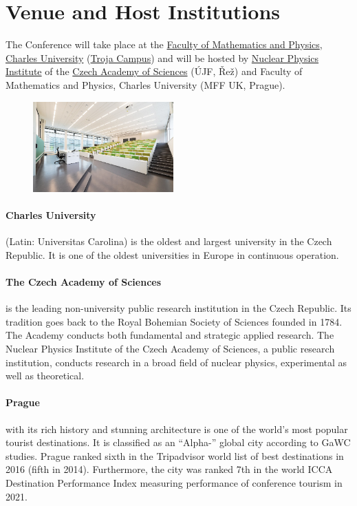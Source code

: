 \documentclass[12pt]{extarticle}
\begin{document}
\section*{Venue and Host Institutions}
\noindent
The Conference will take place at the
\href{https://www.mff.cuni.cz/en}{Faculty of Mathematics and Physics},
\href{https://cuni.cz/UKEN-1.html}{Charles University}
(\href{https://maps.app.goo.gl/YLm43Nb5XHHziMX16}{Troja Campus})
and will be hosted by
\href{http://www.ujf.cas.cz/en/}{Nuclear Physics Institute} of the
\href{https://www.avcr.cz/en/}{Czech Academy of Sciences} (ÚJF, Řež)
and Faculty of Mathematics and Physics, Charles University (MFF UK,
Prague).
\begin{figure}
  \centering
  \includegraphics[width=0.48\textwidth]{Impakt-troja_1}
\end{figure}

\paragraph{Charles University} (Latin: Universitas Carolina) is the oldest and
largest university in the Czech Republic. It is one of the oldest
universities in Europe in continuous operation.
% 

\paragraph{The Czech Academy of Sciences} is the leading non-university public
research institution in the Czech Republic. Its tradition goes back to
the Royal Bohemian Society of Sciences founded in 1784. The Academy
conducts both fundamental and strategic applied research. The
  Nuclear Physics Institute of the Czech Academy of Sciences, a
public research institution, conducts research in a broad field of
nuclear physics, experimental as well as theoretical.
%

\paragraph{Prague} with its rich history and stunning architecture is one of the
world's most popular tourist destinations. It is classified as an
``Alpha-{}'' global city according to GaWC studies. Prague ranked sixth
in the Tripadvisor world list of best destinations in 2016 (fifth in
2014). Furthermore, the city was ranked 7th in the world ICCA
Destination Performance Index measuring performance of conference
tourism in 2021.
\end{document}
